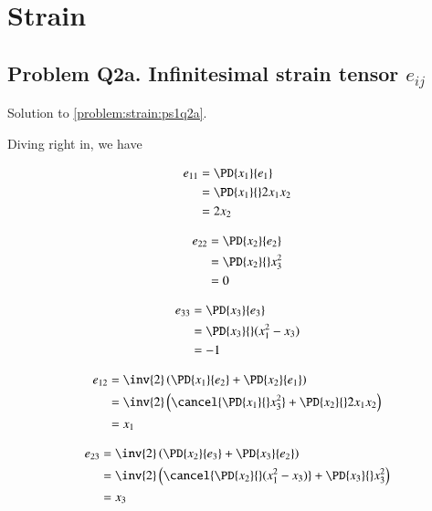 
\beginArtWithToc

\chapter{Strain}

\label{solutions:ps1q2a}
\section{Problem Q2a.  Infinitesimal strain tensor $e_{ij}$}

Solution to \ref{problem:strain:ps1q2a}.

Diving right in, we have

\begin{align*}
e_{11}
&= \PD{x_1}{e_1} \\
&= \PD{x_1}{}2 x_1 x_2 \\
&= 2 x_2
\end{align*}

\begin{align*}
e_{22}
&= \PD{x_2}{e_2} \\
&= \PD{x_2}{} x_3^2 \\
&= 0
\end{align*}

\begin{align*}
e_{33}
&= \PD{x_3}{e_3} \\
&= \PD{x_3}{} ( x_1^2 - x_3 ) \\
&= -1
\end{align*}

\begin{align*}
e_{12}
&=
\inv{2} \left(
\PD{x_1}{e_2}
+
\PD{x_2}{e_1}
\right) \\
&=
\inv{2}
\left(
\cancel{\PD{x_1}{} x_3^2 }
+
\PD{x_2}{} 2 x_1 x_2
\right) \\
&=
x_1
\end{align*}

\begin{align*}
e_{23}
&=
\inv{2} \left(
\PD{x_2}{e_3}
+
\PD{x_3}{e_2}
\right) \\
&=
\inv{2}
\left(
\cancel{\PD{x_2}{} (x_1^2 - x_3 )}
+
\PD{x_3}{} x_3^2
\right) \\
&=
x_3
\end{align*}

